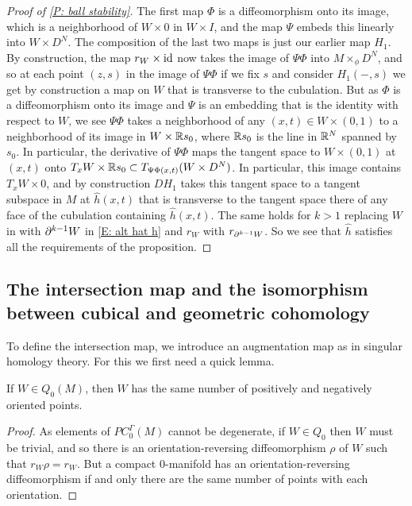 \begin{proof}[Proof of \cref{P: ball stability}]
The first map $\Phi$ is a diffeomorphism onto its image, which is a neighborhood of $W\times 0$ in $W\times I$, and the map $\Psi$ embeds this linearly into $W\times D^N$. The composition of the last two maps is just our earlier map $H_1$. By construction, the map $r_W\times \mathrm{id}$ now takes the image of $\Psi\Phi$ into $M\times_\phi D^N$, and so at each point $(z,s)$ in the image of $\Psi\Phi$ if we fix $s$ and consider $H_1(-,s)$ we get by construction a map on $W$ that is transverse to the cubulation. But as $\Phi$ is a diffeomorphism onto its image and $\Psi$ is an embedding that is the identity with respect to $W$, we see $\Psi\Phi$ takes a neighborhood of any $(x,t)\in W\times (0,1)$ to a neighborhood of its image in $W\times \mathbb{R} s_0$, where $\mathbb{R} s_0$ is the line in $\mathbb{R}^N$ spanned by $s_0$. In particular, the derivative of $\Psi\Phi$ maps the tangent space to $W\times (0,1)$ at $(x,t)$ onto $ T_xW\times \mathbb{R} s_0\subset T_{\Psi\Phi(x,t)}(W\times D^N)$. In particular, this image contains $T_xW\times 0$, and by construction $DH_1$ takes this tangent space to a tangent subspace in $M$ at $\hat h(x,t)$ that is transverse to the tangent space there of any face of the cubulation containing  $\hat h(x,t)$. The same holds for $k>1$ replacing $W$ in with $\partial^{k-1}W$ in \eqref{E: alt hat h} and $r_W$ with $r_{\partial^{k-1}W}$. So we see that $\hat h$ satisfies all the requirements of the proposition.
\end{proof}






\subsection{The intersection map and the isomorphism between cubical and geometric cohomology}\label{S: intersection map}

To define the intersection map, we introduce an augmentation map as in singular homology theory. For this we first need a quick lemma.

\begin{lemma}\label{L: Q0}
If $W\in Q_0(M)$, then $W$ has the same number of positively and negatively oriented points.
\end{lemma}
\begin{proof}
 As elements of $PC_0^\Gamma(M)$ cannot be degenerate, if $W\in Q_0$ then $W$ must be trivial, and so there is an orientation-reversing diffeomorphism $\rho$ of $W$ such that $r_W\rho=r_W$. But a compact $0$-manifold has an orientation-reversing diffeomorphism if and only there are the same number of points with each orientation.
\end{proof}

